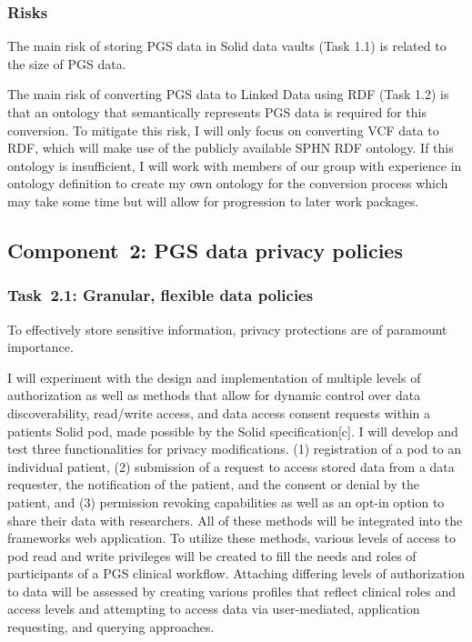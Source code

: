 \documentclass[a4paper,11pt]{article}
\begin{document}
\begin{refsection}
\subsubsection{Risks}
The main risk of storing PGS data in Solid data vaults (Task 1.1)
is related to the size of PGS data. 

The main risk of converting PGS data to Linked Data using RDF (Task 1.2)
is that an ontology that semantically represents PGS data is required for this conversion. 
To mitigate this risk, I will only focus on converting VCF data to RDF, which will make use of the publicly available SPHN RDF ontology.
If this ontology is insufficient, I will work with members of our group with experience in ontology definition to create my own ontology for the conversion process which may take some time but will allow for progression to later work packages.


\newcommand\WPb{PGS data privacy policies}
\subsection{Component~2: \WPb}



\newcommand\WPba{Granular, flexible data policies}
\subsubsection{Task~2.1: \WPba}
To effectively store sensitive information, privacy protections are of paramount importance. 

I will experiment with the design and implementation of multiple levels of authorization as well as methods that allow for dynamic control over data discoverability, read/write access, and data access consent requests within a patient\textquotesingle s Solid pod, made possible by the Solid specification[c]. 
I will develop and test three functionalities for privacy modifications.
(1) registration of a pod to an individual patient,
(2) submission of a request to access stored data from a data requester, the notification of the patient, and the consent or denial by the patient, and
(3) permission revoking capabilities as well as an opt-in option to share their data with researchers. 
All of these methods will be integrated into the framework\textquotesingle s web application.
To utilize these methods, various levels of access to pod read and write privileges will be created to fill the needs and roles of participants of a PGS clinical workflow. 
Attaching differing levels of authorization to data will be assessed by creating various profiles that reflect clinical roles and access levels and attempting to access data via user-mediated, application requesting, and querying approaches. 


\end{refsection}
\end{document}
